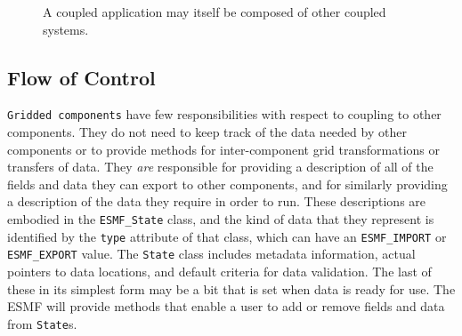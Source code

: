 \begin{figure}
\caption[{Scoping of Components in a Coupled Application}]{A coupled
application may itself be composed of other coupled systems.}
\label{fig:couplerscaling}
\begin{center}
\end{center}
\end{figure}


\subsection{Flow of Control}
\label{sec:controlflow}
{\tt Gridded components} have few responsibilities with respect to coupling
to other components.  They do not need to keep track of the data needed
by other components or to provide methods for inter-component 
grid transformations or transfers of data.  They {\it are} responsible for 
providing a description of all of the fields and data they
can export to other components, and for similarly providing a description 
of the data they require in order to run.  These descriptions are
embodied in the {\tt ESMF\_State} class, and the kind of data that they 
represent is identified by the {\tt type} attribute of that class, which can
have an {\tt ESMF\_IMPORT} or {\tt ESMF\_EXPORT} value.  The {\tt State} class
includes metadata information, actual pointers to data 
locations, and default criteria for data validation.  The last of these in its
simplest form may be a bit that is set when data is ready for use.  The ESMF 
will provide methods that enable a user to add or remove fields and data from 
{\tt State}s.  

